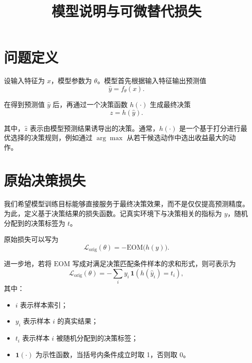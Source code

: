 \documentclass{article}
\title{模型说明与可微替代损失}
\author{}
\date{}
\begin{document}
\maketitle

\section{问题定义}

设输入特征为 \(x\)，模型参数为 \(\theta\)。模型首先根据输入特征输出预测值
\begin{equation}
\hat y = f_\theta(x).
\end{equation}

在得到预测值 \(\hat y\) 后，再通过一个决策函数 \(h(\cdot)\) 生成最终决策
\begin{equation}
\hat z = h(\hat y).
\end{equation}

其中，\(\hat z\) 表示由模型预测结果诱导出的决策。通常，\(h(\cdot)\) 是一个基于打分进行最优选择的决策规则，例如通过 \(\arg\max\) 从若干候选动作中选出收益最大的动作。

\section{原始决策损失}

我们希望模型训练目标能够直接服务于最终决策效果，而不是仅仅提高预测精度。为此，定义基于决策结果的损失函数。记真实环境下与决策相关的指标为 \(y\)，随机分配到的决策标签为 \(t\)。

原始损失可以写为
\begin{equation}
\mathcal{L}_{\text{orig}}(\theta) = - \mathrm{EOM}\bigl(h(\hat y)\bigr).
\end{equation}

进一步地，若将 \(\mathrm{EOM}\) 写成对满足决策匹配条件样本的求和形式，则可表示为
\begin{equation}
\mathcal{L}_{\text{orig}}(\theta)
= - \sum_{i} y_i \, \mathbf{1}\!\left(h(\hat y_i)=t_i\right),
\end{equation}
其中：
\begin{itemize}
    \item \(i\) 表示样本索引；
    \item \(y_i\) 表示样本 \(i\) 的真实结果；
    \item \(t_i\) 表示样本 \(i\) 被随机分配到的决策标签；
    \item \(\mathbf{1}(\cdot)\) 为示性函数，当括号内条件成立时取 1，否则取 0。
\end{itemize}
\end{document}

